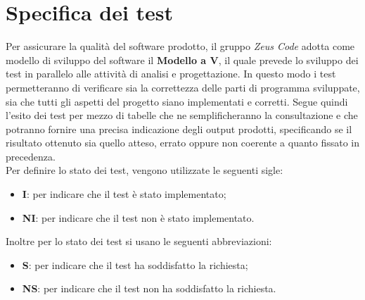 \section{Specifica dei test}
Per assicurare la qualità del software prodotto, il gruppo \textit{Zeus Code} adotta come modello di sviluppo del software il
\textbf{Modello a V\glo}, il quale prevede lo sviluppo dei test in parallelo alle attività di analisi e progettazione. In questo modo i test permetteranno di verificare sia la correttezza delle parti di programma sviluppate, sia che tutti gli aspetti del progetto siano implementati e corretti. Segue quindi l'esito dei test per mezzo di tabelle che ne semplificheranno la consultazione e che potranno fornire una precisa indicazione degli output prodotti, specificando se il risultato ottenuto sia quello atteso, errato oppure non coerente a quanto fissato in precedenza. \\
Per definire lo stato dei test, vengono utilizzate le seguenti sigle:
\begin{itemize}
	\item \textbf{I}: per indicare che il test è stato implementato;
	\item \textbf{NI}: per indicare che il test non è stato implementato.
\end{itemize}
Inoltre per lo stato dei test si usano le seguenti abbreviazioni:
\begin{itemize}
	\item \textbf{S}: per indicare che il test ha soddisfatto la richiesta;
	\item \textbf{NS}: per indicare che il test non ha soddisfatto la richiesta.
\end{itemize}
